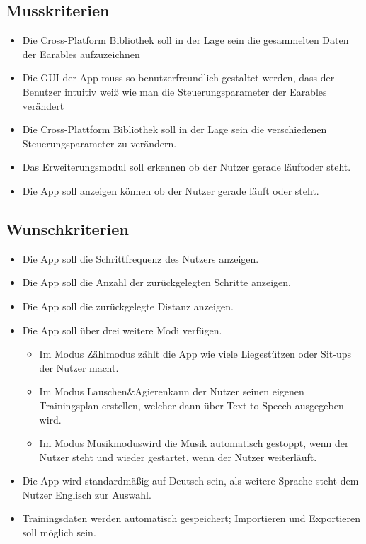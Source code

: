 \documentclass[a4paper,12pt]{article}
\begin{document}
\subsection{Musskriterien}

  \begin{itemize}
    \item\text Die Cross-Platform Bibliothek soll in der Lage sein die gesammelten Daten der \Gls{Earables} aufzuzeichnen
    \item\text Die GUI der App muss so benutzerfreundlich gestaltet werden, dass der Benutzer intuitiv weiß wie man die Steuerungsparameter der \Gls{Earables} verändert
    \item\text Die Cross-Plattform Bibliothek soll in der Lage sein die verschiedenen Steuerungsparameter zu verändern.
    \item\text Das Erweiterungsmodul soll erkennen ob der Nutzer gerade \glqq läuft\grqq{}oder \glqq steht\grqq.
    \item\text Die App soll anzeigen können ob der Nutzer gerade läuft oder steht.
  \end{itemize}
\subsection{Wunschkriterien}
  \begin{itemize}
    \item\text Die App soll die \Gls{Schrittfrequenz} des Nutzers anzeigen.
    \item\text Die App soll die Anzahl der zurückgelegten Schritte anzeigen.
    \item\text Die App soll die zurückgelegte Distanz anzeigen.
    \item\text Die App soll über drei weitere Modi verfügen.
      \begin{itemize}
        \item\text Im Modus \glqq Zählmodus\grqq{} zählt die App wie viele Liegestützen oder Sit-ups der Nutzer macht.
        \item\text  Im Modus \glqq Lauschen\&Agieren\grqq{}kann der Nutzer seinen eigenen Trainingsplan erstellen, welcher dann über Text to Speech ausgegeben wird.
        \item\text  Im Modus \glqq Musikmodus\grqq{}wird die Musik automatisch gestoppt, wenn der Nutzer steht und wieder gestartet, wenn der Nutzer weiterläuft.
      \end{itemize}
    \item\text Die App wird standardmäßig auf Deutsch sein, als weitere Sprache steht dem Nutzer Englisch zur Auswahl.
    \item\text Trainingsdaten werden automatisch gespeichert; Importieren und Exportieren soll möglich sein.
  \end{itemize}
\end{document}
